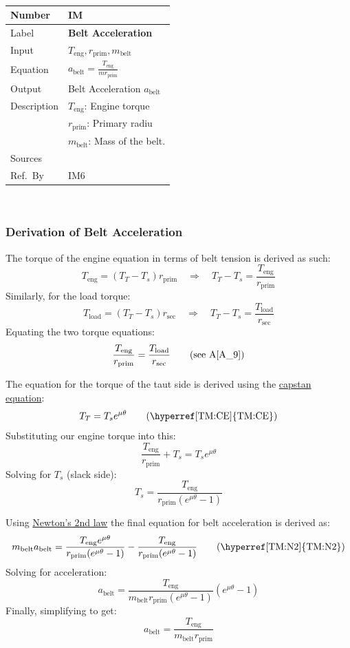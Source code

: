 \documentclass[12pt]{article}
\newcommand{\colAwidth}{0.13\textwidth}
\newcommand{\colBwidth}{0.82\textwidth}
\newcommand{\aref}[1]{A\ref{#1}}
\newcounter{instnum} %
\newcommand{\definstance}[7] {
~\newline
\noindent
\begin{minipage}{\textwidth}
\renewcommand*{\arraystretch}{1.5}
\begin{tabular}{| p{\colAwidth} | p{\colBwidth}|}
  \hline
  \rowcolor[gray]{0.9}
  Number& IM\refstepcounter{instnum}\theinstnum \label{inst:\theinstnum}\\
  \hline
  Label& \bf #1 \\
  \hline
  Input& #2\\
  \hline
  Equation& #3\\
  \hline
  Output& #4\\
  \hline
  Description& #5 \\
  \hline
  Sources& #6 \\
  \hline
  Ref.\ By & #7\\
  \hline
\end{tabular}
\end{minipage}\\
}
\begin{document}
\definstance
{Belt Acceleration}
{$T_{\text{eng}}, r_{\text{prim}}, m_\text{belt}$ } %
{$a_{\text{belt}} = \frac{T_{\text{eng}}}{m r_{\text{prim}}}$} %
{Belt Acceleration $a_{\text{belt}}$} %
{$T_{\text{eng}}$: Engine torque\\
   &$r_{\text{prim}}$: Primary radiu\\
   &$m_\text{belt}$: Mass of the belt.} %
{} %
{IM6} %
\subsubsection*{Derivation of Belt Acceleration}

The torque of the engine equation in terms of belt tension is derived as such: \\
\[T_{\text{eng}} = (T_T - T_s) r_{\text{prim}} \quad \Rightarrow \quad T_T - T_s = \frac{T_{\text{eng}}}{r_{\text{prim}}}\] %
Similarly, for the load torque: \\
\[T_{\text{load}} = (T_T - T_s) r_{\text{sec}} \quad \Rightarrow \quad T_T - T_s = \frac{T_{\text{load}}}{r_{\text{sec}}}\] %
Equating the two torque equations: \\
\[\frac{T_{\text{eng}}}{r_{\text{prim}}} = \frac{T_{\text{load}}}{r_{\text{sec}}} \tag*{\text{(see \aref{A_9})}}\] 
{\newline}

The equation for the torque of the taut side is derived using the \hyperref[TM:CE]{capstan equation}:
\[T_T = T_s e^{\mu \theta} \tag*{\text{(\hyperref[TM:CE]{TM:CE})}}\]
Substituting our engine torque into this: \\
\[\frac{T_{\text{eng}}}{r_{\text{prim}}} + T_s = T_s e^{\mu \theta}\]
Solving for \(T_s\) (slack side): \\
\[T_s = \frac{T_{\text{eng}}}{r_{\text{prim}} (e^{\mu \theta} - 1)}\]
{\newline}

Using \hyperref[TM:N2]{Newton's 2nd law} the final equation for belt acceleration is derived as: \\
\[m_\text{belt} a_{\text{belt}} = \frac{T_{\text{eng}} e^{\mu \theta}}{r_{\text{prim}} (e^{\mu \theta} - 1)} - \frac{T_{\text{eng}}}{r_{\text{prim}} (e^{\mu \theta} - 1)}  \tag*{\text{(\hyperref[TM:N2]{TM:N2})}}\]
Solving for acceleration: \\
\[a_{\text{belt}} = \frac{T_{\text{eng}}}{m_\text{belt} r_{\text{prim}} (e^{\mu \theta} - 1)} (e^{\mu \theta} - 1)\]
Finally, simplifying to get: \\
\[a_{\text{belt}} = \frac{T_{\text{eng}}}{m_\text{belt} r_{\text{prim}}}\]
\end{document}
